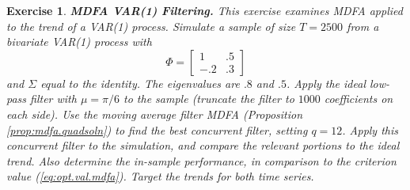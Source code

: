 \documentclass[a4paper]{book}
\newtheorem{Exercise}{Exercise}
\begin{document}
\begin{Exercise} {\bf MDFA VAR(1) Filtering.} \rm
\label{exer:var1mdfa.filter}
 This exercise examines MDFA applied to the trend of a  VAR(1) process.
Simulate a sample of size $T=2500$ from a
 bivariate VAR(1) process with 
\[
  \Phi = \left[ \begin{array}{ll} 1 & .5 \\ -.2 & .3 \end{array} \right]
\]
 and $\Sigma$ equal to the identity.  The eigenvalues are $.8$ and $.5$.
  Apply the   ideal low-pass filter  with 
  $\mu = \pi/6$ to the sample (truncate the filter to $1000$ coefficients on each side).  
 Use the moving average filter
 MDFA  (Proposition \ref{prop:mdfa.quadsoln}) to find the best
 concurrent filter, setting $q= 12$. 
 Apply this concurrent filter 
 to the simulation, and compare the relevant portions to the ideal trend.
 Also determine the in-sample performance, in comparison to the criterion value
 (\ref{eq:opt.val.mdfa}).
  Target the trends for both time series.
\end{Exercise}
\end{document}
